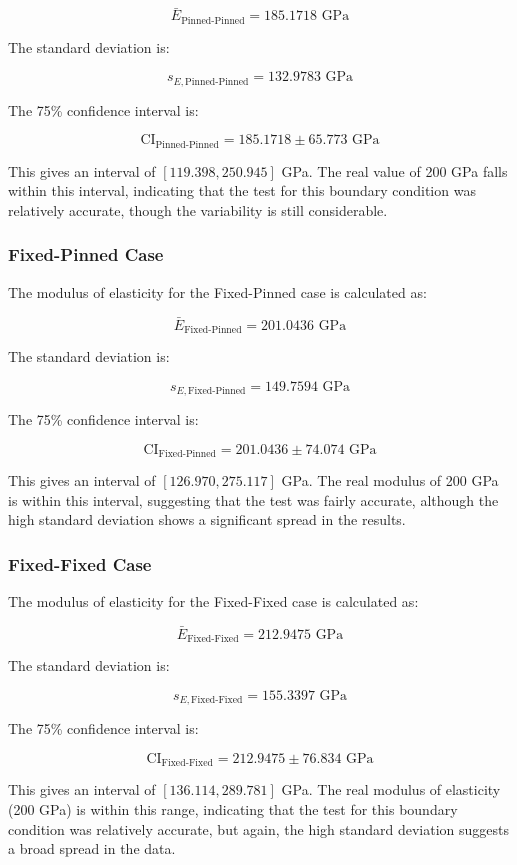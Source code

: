 \documentclass[12pt]{article}
\begin{document}
\[
\bar{E}_{\text{Pinned-Pinned}} = 185.1718 \text{ GPa}
\]

The standard deviation is:

\[
s_{E, \text{Pinned-Pinned}} = 132.9783 \text{ GPa}
\]

The 75\% confidence interval is:

\[
\text{CI}_{\text{Pinned-Pinned}} = 185.1718 \pm 65.773 \text{ GPa}
\]

This gives an interval of \( [119.398, 250.945] \) GPa. The real value of 200 GPa falls within this interval, indicating that the test for this boundary condition was relatively accurate, though the variability is still considerable.

\subsubsection{Fixed-Pinned Case}
The modulus of elasticity for the Fixed-Pinned case is calculated as:

\[
\bar{E}_{\text{Fixed-Pinned}} = 201.0436 \text{ GPa}
\]

The standard deviation is:

\[
s_{E, \text{Fixed-Pinned}} = 149.7594 \text{ GPa}
\]

The 75\% confidence interval is:

\[
\text{CI}_{\text{Fixed-Pinned}} = 201.0436 \pm 74.074 \text{ GPa}
\]

This gives an interval of \( [126.970, 275.117] \) GPa. The real modulus of 200 GPa is within this interval, suggesting that the test was fairly accurate, although the high standard deviation shows a significant spread in the results.

\subsubsection{Fixed-Fixed Case}
The modulus of elasticity for the Fixed-Fixed case is calculated as:

\[
\bar{E}_{\text{Fixed-Fixed}} = 212.9475 \text{ GPa}
\]

The standard deviation is:

\[
s_{E, \text{Fixed-Fixed}} = 155.3397 \text{ GPa}
\]

The 75\% confidence interval is:

\[
\text{CI}_{\text{Fixed-Fixed}} = 212.9475 \pm 76.834 \text{ GPa}
\]

This gives an interval of \( [136.114, 289.781] \) GPa. The real modulus of elasticity (200 GPa) is within this range, indicating that the test for this boundary condition was relatively accurate, but again, the high standard deviation suggests a broad spread in the data.
\end{document}
